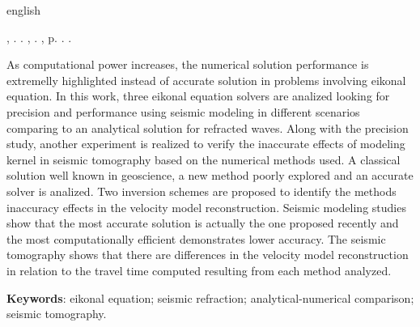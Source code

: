 \begin{resumo}[Abstract]
    \begin{otherlanguage*}{english}

\begin{flushleft}
\MakeUppercase{\imprimirSobrenome}, \imprimirPrimeirosNomes. \textbf{\imprimirTituloEmIngles}. \imprimirtipotrabalhoIngles, \imprimirinstituicaoIngles. \imprimirlocal,  p. \pageref{LastPage}. \imprimirAnoDeDefesa.
\end{flushleft}

        \fonteResumo
        As computational power increases, the numerical solution performance is extremelly highlighted instead of accurate solution in problems involving eikonal equation. In this work, three eikonal equation solvers are analized looking for precision and performance using seismic modeling in different scenarios comparing to an analytical solution for refracted waves. Along with the precision study, another experiment is realized to verify the inaccurate effects of modeling kernel in seismic tomography based on the numerical methods used. A classical solution well known in geoscience, a new method poorly explored and an accurate solver is analized. Two inversion schemes are proposed to identify the methods inaccuracy effects in the velocity model reconstruction. Seismic modeling studies show that the most accurate solution is actually the one proposed recently and the most computationally efficient demonstrates lower accuracy. The seismic tomography shows that there are differences in the velocity model reconstruction in relation to the travel time computed resulting from each method analyzed.     
    
        \vspace{\onelineskip}
     
        \noindent 
        \textbf{Keywords}: eikonal equation; seismic refraction; analytical-numerical comparison; seismic tomography.
    \end{otherlanguage*}
\end{resumo}
